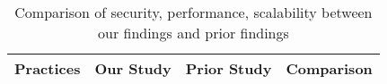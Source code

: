 \begin{table}[h]
\caption{Comparison of security, performance, scalability between our findings and prior findings}
\begin{tabular}{llll}
\hline
\multicolumn{1}{c}{\textbf{Practices}}& \textbf{Our Study}& \textbf{Prior Study}&\multicolumn{1}{c}{\textbf{Comparison}}\\ \hline 


\end{tabular}
\end{table}
